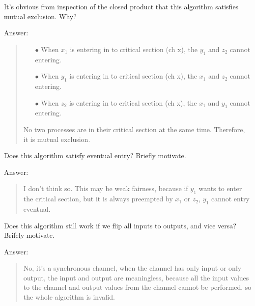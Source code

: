 \documentclass{article}
\begin{document}
\begin{Question} 
\begin{Subquestion}
    It's obvious from inspection of the closed product that this algorithm satisfies mutual exclusion. Why?
\begin{answer}
    Answer: 
    
    
\begin{quote}
    \begin{itemize}
        \item[$\bullet$] When $x_1$ is entering in to critical section (ch \Rightarrow x), the $y_1$ and $z_2$ cannot entering.
        \item[$\bullet$] When $y_1$ is entering in to critical section (ch \Rightarrow x), the $x_1$ and $z_2$ cannot entering.
        \item[$\bullet$] When $z_2$ is entering in to critical section (ch \Rightarrow x), the $x_1$ and $y_1$ cannot entering.
    \end{itemize}
    No two processes are in their critical section at the same time. Therefore, it is mutual exclusion.\\
\end{quote}
\end{answer}
\end{Subquestion}


\begin{Subquestion}
    Does this algorithm satisfy eventual entry? Briefly motivate.
\begin{answer}
    Answer:
\begin{quote}
    I don't think so. This may be weak fairness, because if $y_1$ wants to enter the critical section, but it is always preempted by $x_1$ or $z_2$, $y_1$ cannot entry eventual.\\
\end{quote}
\end{answer}
\end{Subquestion}


\begin{Subquestion}
    Does this algorithm still work if we flip all inputs to outputs, and vice versa? Brifely motivate.
\begin{answer}
    Answer: 
\begin{quote}
    No, it's a synchronous channel, when the channel has only input or only output, the input and output are meaningless, because all the input values to the channel and output values from the channel cannot be performed, so the whole algorithm is invalid.\\
\end{quote}
\end{answer}
\end{Subquestion}



\end{Question}
\end{document}
